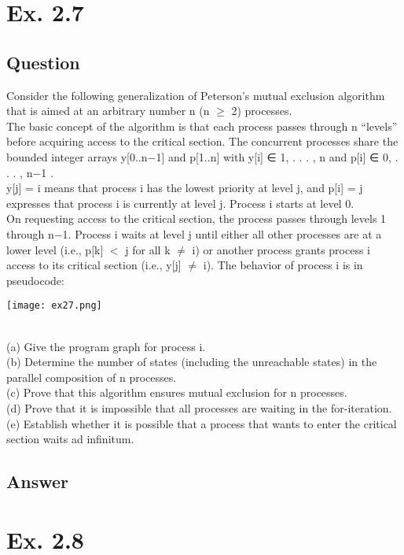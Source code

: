 \documentclass[12pt]{article}
\begin{document}
\newpage
\section*{Ex. 2.7}
\subsection*{Question}
Consider the following generalization of Peterson’s mutual exclusion algorithm
that is aimed at an arbitrary number n (n $\geq$ 2) processes.\\
The basic concept of the algorithm is that each process passes through n “levels” before acquiring access to the critical section. The concurrent processes share the bounded integer arrays y[0..n−1] and p[1..n] with y[i] ∈ {1, . . . , n } and p[i] ∈ {0, . . . , n−1 }. \\
y[j] = i means that process i has the lowest priority at level j, and p[i] = j expresses that process i is currently at level j. Process i starts at level 0. \\
On requesting access to the critical section, the process passes through levels 1 through n−1. Process i waits at
level j until either all other processes are at a lower level (i.e., p[k] $<$ j for all k $\neq$ i) or another
process grants process i access to its critical section (i.e., y[j] $\neq$ i). The behavior of process i is in
pseudocode:\\
\begin{centering}
	\texttt{[image: ex27.png]}
\end{centering}\\
(a) Give the program graph for process i.\\
(b) Determine the number of states (including the unreachable states) in the parallel composition
of n processes.\\
(c) Prove that this algorithm ensures mutual exclusion for n processes.\\
(d) Prove that it is impossible that all processes are waiting in the for-iteration.\\
(e) Establish whether it is possible that a process that wants to enter the critical section waits
ad infinitum.\\

\subsection*{Answer}

\newpage
\section*{Ex. 2.8}
\end{document}
